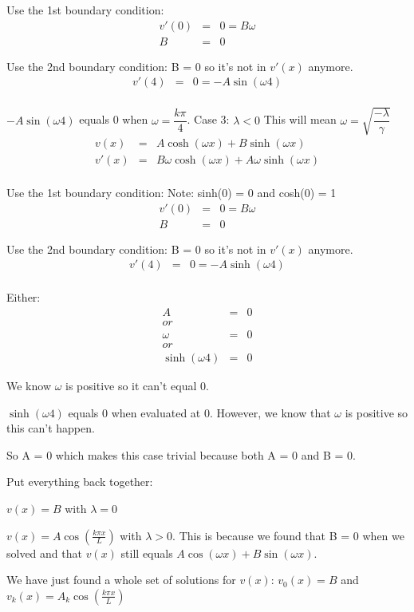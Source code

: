 \documentclass{article}
\newcommand{\bea}{\begin{eqnarray*}}
\newcommand{\eea}{\end{eqnarray*}}
\begin{document}
Use the 1st boundary condition:
\bea
v'(0) &=& 0 = B\omega\\
B &=& 0
\eea

Use the 2nd boundary condition: B = 0 so it's not in $v'(x)$ anymore.
\bea
v'(4) &=& 0 = -A\sin(\omega 4)\\
\eea

$-A\sin(\omega 4)$ equals 0 when $\omega = \dfrac{k\pi}{4}$. \newline
Case 3: $\lambda < 0$ This will mean $\omega=\sqrt{\dfrac{-\lambda}{\gamma}}$
\bea
v(x) &=& A\cosh(\omega x)+B\sinh(\omega x) \\
v'(x) &=& B\omega \cosh(\omega x)+A\omega \sinh(\omega x)  \\
\eea

Use the 1st boundary condition: \newline
Note: sinh(0) = 0 and cosh(0) = 1
\bea
v'(0) &=& 0 = B\omega\\
B &=& 0
\eea

Use the 2nd boundary condition: B = 0 so it's not in $v'(x)$ anymore.
\bea
v'(4) &=& 0 = -A\sinh(\omega 4)\\
\eea

Either:
\bea
A &=& 0 \\
or\\
\omega &=& 0 \\
or\\
\sinh(\omega 4) &=& 0
\eea

We know $\omega$ is positive so it can't equal 0.\newline 

$\sinh(\omega 4)$ equals 0 when evaluated at 0. However, we know that $\omega$ is positive so this can't happen. \newline

So A = 0 which makes this case trivial because both A = 0 and B = 0. \newline 

Put everything back together:

$v(x) = B$ with $\lambda=0$\newline 

$v(x) = A\cos\left(\frac{k \pi x}{L}\right)$ with $\lambda > 0$.  This is because we found that B = 0 when we solved and that $v(x)$ still equals $A\cos(\omega x)+B\sin(\omega x)$.  \newline

We have just found a whole set of solutions for $v(x)$: $v_0(x) = B$ and $v_k(x) = A_k\cos\left(\frac{k\pi x}{L}\right)$\\
\end{document}
